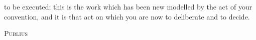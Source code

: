 to be executed; this is the work which has been new modelled by the act of your convention, and it is that act on which you are now to deliberate and to decide.

\vspace{.5cm}
\textsc{Publius}

\vspace{1.5cm}

